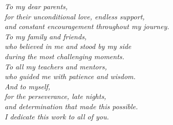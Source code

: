 
\vspace*{\fill}
\begin{center}
\textit{To my dear parents,}\\[0.5cm]
\textit{for their unconditional love, endless support,}\\
\textit{and constant encouragement throughout my journey.}\\[1cm]
\textit{To my family and friends,}\\[0.5cm]
\textit{who believed in me and stood by my side}\\
\textit{during the most challenging moments.}\\[1cm]
\textit{To all my teachers and mentors,}\\[0.5cm]
\textit{who guided me with patience and wisdom.}\\[1cm]
\textit{And to myself,}\\[0.5cm]
\textit{for the perseverance, late nights,}\\
\textit{and determination that made this possible.}\\[1cm]
\textit{I dedicate this work to all of you.}
\end{center}
\vspace*{\fill}
